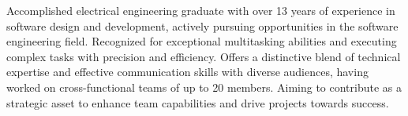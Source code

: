 

\begin{cvparagraph}

Accomplished electrical engineering graduate with over 13 years of experience in software design and
development, actively pursuing opportunities in the software engineering field. Recognized for exceptional
multitasking abilities and executing complex tasks with precision and efficiency. Offers a distinctive blend of
technical expertise and effective communication skills with diverse audiences, having worked on cross-functional
teams of up to 20 members. Aiming to contribute as a strategic asset to enhance team capabilities and drive
projects towards success.
\end{cvparagraph}
